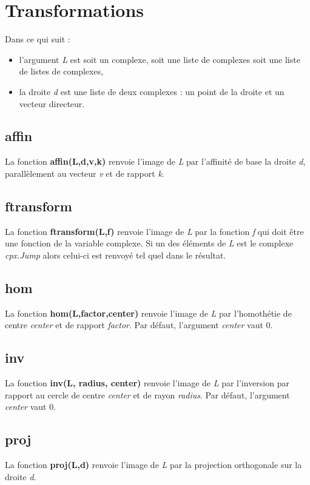 \section{Transformations}
Dans ce qui suit :
\begin{itemize}
    \item l'argument \emph{L} est soit un complexe, soit une liste de complexes soit une liste de listes de complexes,
    \item la droite \emph{d} est une liste de deux complexes : un point de la droite et un vecteur directeur.
  \end{itemize}
  
\subsection{affin}
La fonction \textbf{affin(L,d,v,k)} renvoie l'image de \emph{L} par l'affinité de base la droite \emph{d}, parallèlement au vecteur \emph{v} et de rapport \emph{k}.

\subsection{ftransform}
La fonction \textbf{ftransform(L,f)} renvoie l'image de \emph{L} par la fonction \emph{f} qui doit être une fonction de la variable complexe. Si un des éléments de \emph{L} est le complexe \emph{cpx.Jump} alors celui-ci est renvoyé tel quel dans le résultat.

\subsection{hom}
La fonction \textbf{hom(L,factor,center)} renvoie l'image de \emph{L} par l'homothétie de centre \emph{center} et de rapport \emph{factor}. Par défaut, l'argument \emph{center} vaut 0.

\subsection{inv}
La fonction \textbf{inv(L, radius, center)} renvoie l'image de \emph{L} par l'inversion par rapport au cercle de centre \emph{center} et de rayon \emph{radius}. Par défaut, l'argument \emph{center} vaut 0.

\subsection{proj}
La fonction \textbf{proj(L,d)} renvoie l'image de \emph{L} par la projection orthogonale sur la droite \emph{d}.

